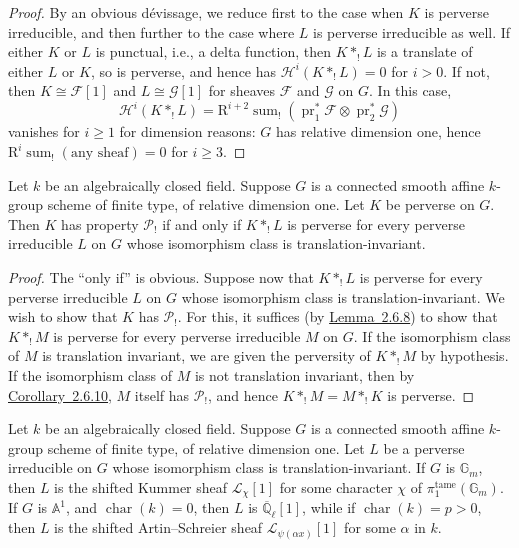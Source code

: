 \begin{proof}
By an obvious dévissage, we reduce first to the case when \(K\) is
perverse irreducible, and then further to the case where \(L\) is perverse
irreducible as well. If either \(K\) or \(L\) is punctual, i.e., a delta
function, then \(K*_!L\) is a translate of either \(L\) or \(K\), so is
perverse, and hence has \(\mathcal{H}^i(K*_!L)=0\) for \(i>0\). If not, then
\(K\cong\mathcal{F}[1]\) and \(L\cong\mathcal{G}[1]\) for sheaves
\(\mathcal{F}\) and \(\mathcal{G}\) on \(G\). In this case,
\[
  \mathcal{H}^i(K*_!L)
  =
  \mathrm{R}^{i+2}\operatorname{sum}_!
  (\operatorname{pr}_1^*\mathcal{F}\otimes\operatorname{pr}_2^*\mathcal{G})
\]
vanishes for \(i\geq1\) for dimension reasons: \(G\) has relative dimension
one, hence \(\mathrm{R}^i\operatorname{sum}_!(\text{any sheaf})=0\) for
\(i\geq3\).
\end{proof}

Let \(k\) be an algebraically closed field. Suppose \(G\) is a connected smooth
affine \(k\)-group scheme of finite type, of relative dimension one. Let \(K\)
be perverse on \(G\). Then \(K\) has property \(\mathcal{P}_!\) if and only if
\(K*_!L\) is perverse for every perverse irreducible \(L\) on \(G\) whose
isomorphism class is translation-invariant.

\begin{proof}
The ``only if'' is obvious. Suppose now that \(K*_!L\) is perverse for every
perverse irreducible \(L\) on \(G\) whose isomorphism class is
translation-invariant. We wish to show that \(K\) has \(\mathcal{P}_!\). For
this, it suffices (by \hyperref[lem:2.6.8]{Lemma~2.6.8}) to show that \(K*_!M\) is perverse for every
perverse irreducible \(M\) on \(G\). If the isomorphism class of \(M\) is
translation invariant, we are given the perversity of \(K*_!M\) by hypothesis.
If the isomorphism class of \(M\) is not translation invariant, then by \hyperref[cor:2.6.10]{Corollary~2.6.10},
\(M\) itself has \(\mathcal{P}_!\), and hence \(K*_!M=M*_!K\) is perverse.
\end{proof}

Let \(k\) be an algebraically closed field. Suppose \(G\) is a connected smooth
affine \(k\)-group scheme of finite type, of relative dimension one. Let \(L\)
be a perverse irreducible on \(G\) whose isomorphism class is
translation-invariant. If \(G\) is \(\mathbb{G}_m\), then \(L\) is the shifted
Kummer sheaf \(\mathcal{L}_\chi[1]\) for some character \(\chi\) of
\(\pi_1^{\mathrm{tame}}(\mathbb{G}_m)\). If \(G\) is \(\mathbb{A}^1\), and
\(\operatorname{char}(k)=0\), then \(L\) is
\(\overline{\mathbb{Q}}_\ell[1]\), while if \(\operatorname{char}(k)=p>0\),
then \(L\) is the shifted Artin--Schreier sheaf
\(\mathcal{L}_{\psi(\alpha x)}[1]\) for some \(\alpha\) in \(k\).

